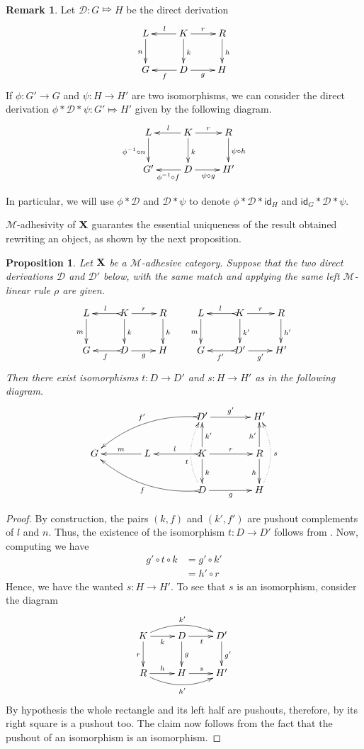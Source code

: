 \documentclass[a4paper]{article}
\newcommand{\id}[1]{\mathsf{id}_{#1}}
\def\X{\textbf {\textup{X}}}
\newcommand{\dder}[1]{\mathscr{#1}}
\newtheorem{proposition}[theorem]{Proposition}
\theoremstyle{definition}
\newtheorem{remark}[theorem]{Remark}
\begin{document}
\begin{remark}\label{exa:conc} Let  $\dder{D}\colon G\Mapsto H$ be the direct derivation 
		\[\xymatrix{L \ar[d]_{n}& K \ar[d]^{k}\ar[l]_{l} \ar[r]^{r} & R \ar[d]^{h}\\G & \ar[l]^{f} D \ar[r]_{g}& H}\]
	If $\phi\colon G'\to G$ and $\psi\colon H\to H'$ are two isomorphisms, 	we can consider the direct derivation	$\phi * \dder{D}*\psi \colon G'\Mapsto H'$ given by the following diagram.
	\[\xymatrix{L \ar[d]_{\phi^{-1} \circ n}& K \ar[d]^{k}\ar[l]_{l} \ar[r]^{r} & R \ar[d]^{\psi \circ h}\\G' & \ar[l]^{\phi^{-1} \circ f} D \ar[r]_{\psi \circ g}& H'}\]
	
	In particular, we will use $\phi*\dder{D}$ and $\dder{D}*\psi$  to denote $\phi*\dder{D}*\id{H}$ and $\id{G}*\dder{D}*\psi$.
\end{remark}

$\mathcal{M}$-adhesivity of $\X$ guarantes the essential uniqueness of the result obtained rewriting an object, as shown by the next proposition.

\begin{proposition}\label{prop:unique} Let $\X$  be a $\mathcal{M}$-adhesive category. Suppose that the two direct derivations $\mathscr{D}$ and $\mathscr{D'}$ below, with the same match and applying the same left $\mathcal{M}$-linear rule $\rho$ are given.
	\[\xymatrix{L \ar[d]_{m}& K \ar[d]^{k}\ar@{>->}[l]_{l} \ar[r]^{r} & R \ar[d]^{h} & L \ar[d]_{m}& K \ar[d]^{k'}\ar@{>->}[l]_{l} \ar[r]^{r} & R \ar[d]^{h'}\\G & \ar@{>->}[l]^{f} D \ar[r]_{g}& H & G & \ar@{>->}[l]^{f'} D' \ar[r]_{g'}& H'}\]
Then there exist isomorphisms $t\colon D\to D'$ and $s\colon H\to H'$ as in the following diagram.
\[\xymatrix@C=40pt{&&D' \ar[r]^{g'} \ar@{>->}@/_.45cm/[dll]_{f'}&H'\\G & L \ar[l]_{m} & K \ar[u]_{k'} \ar[d]^{k}\ar[r]^{r} \ar@{>->}[l]_{l} &R\ar[u]^{h'} \ar[d]_{h}\\&&D\ar@{>->}@/^.45cm/[ull]^{f}\ar@/^.4cm/@{.>}[uu]^(.4){t}|\hole \ar[r]_{g}&H\ar@/_.4cm/@{.>}[uu]_{s}}\]
\end{proposition}
\begin{proof}
	By construction, the pairs $(k, f)$ and $(k', f')$ are pushout complements of $l$ and $n$. Thus, the existence of the isomorphism $t\colon D\to D'$ follows from . Now, computing we have
	\begin{align*}
		g'\circ t \circ k &= g' \circ k'\\&=h'\circ r
	\end{align*}
	Hence, we have the wanted $s\colon H\to H'$. To see that $s$ is an isomorphism, consider the diagram 
	\[\xymatrix{K  \ar@/^.4cm/[rr]^{k'}\ar[d]_{r} \ar[r]_{k}& \ar[r]_{t} D \ar[d]^{g}& D' \ar[d]^{g'}\\ R \ar@/_.4cm/[rr]_{h'} \ar[r]^{h}& H \ar[r]^{s}& H'}\]
	By hypothesis the whole rectangle and its left half are pushouts, therefore, by  its right square is a pushout too. The claim now follows from the fact that the pushout of an isomorphism is an isomorphism.
\end{proof}
\end{document}
